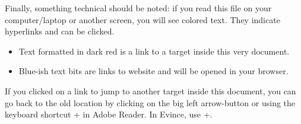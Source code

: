 Finally, something technical should be noted: if you read this file on your computer/laptop or another screen, you will see colored text.
They indicate hyperlinks and can be clicked.
\begin{itemize}
	\item Text formatted in dark red is a link to a target inside this very document.
	\item Blue-ish text bits are links to website and will be opened in your browser.
\end{itemize}
If you clicked on a link to jump to another target inside this document, you can go back to the old location by clicking on the big left arrow-button or using the keyboard shortcut +\keystroke{\( \leftarrow \)}  in Adobe Reader.
In Evince, use +.
